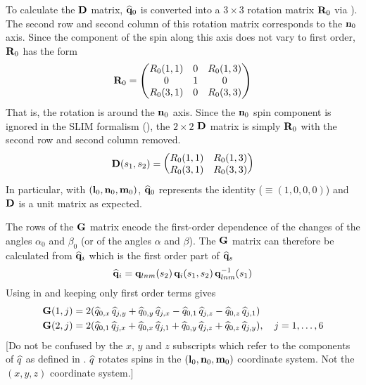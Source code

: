 {To calculate the ${\bf D}$ matrix, $\widehat{{\bf q}}_0$ is converted into a $3 \times 3$ rotation matrix
${\bf R}_0$ via ). The second row and second column of this rotation matrix corresponds to the
${\bf n}_0$ axis. Since the component of the spin along this axis does not vary to first order,
${\bf R}_0$ has the form
\begin{equation}
  {\bf R}_0 = \begin{pmatrix}
      R_0(1,1) & 0 & R_0(1,3) \\
      0        & 1 & 0        \\
      R_0(3,1) & 0 & R_0(3,3)
  \end{pmatrix}
\end{equation}
That is, the rotation is around the ${\bf n}_0$ axis. Since the ${\bf n}_0$ spin component is ignored in
the SLIM formalism (), the $2 \times 2$ ${\bf D}$ matrix is simply ${\bf R}_0$ with the second
row and second column removed.
\begin{equation}
  {\bf D}(s_1, s_2) = \begin{pmatrix}
      R_0(1,1) & R_0(1,3) \\
      R_0(3,1) & R_0(3,3)
  \end{pmatrix}
\end{equation}
In particular, with $({\bf l}_0, {\bf n}_0, {\bf m}_0)$, $\widehat {{\bf q}}_0$ represents the identity ($\equiv
(1, 0, 0, 0)$) and ${\bf D}$ is a unit matrix as expected.

The rows of the ${\bf G}$ matrix encode the first-order dependence of the changes of the angles
$\alpha_0$ and $\beta_0$ (or of the angles $\alpha$ and $\beta$).  The ${\bf G}$ matrix can therefore
be calculated from $\widehat{{\bf q}}_i$ which is the first order part of $\widehat{{\bf q}}_s$
\begin{equation}
  \widehat{{\bf q}}_i = {\bf q}_{lnm}(s_2) \, {\bf q}_i(s_1, s_2) \, {\bf q}_{lnm}^{-1}(s_1)
\end{equation}
Using  in  and keeping only first order terms gives
\begin{align}
  {\bf G}(1,j) &= 2 (\widehat q_{0,x} \, \widehat q_{j,y} + \widehat q_{0,y} \, \widehat q_{j,x} - 
                  \widehat q_{0,1} \, \widehat q_{j,z} - \widehat q_{0,z} \, \widehat q_{j,1}) \\
  {\bf G}(2,j) &= 2 (\widehat q_{0,1} \, \widehat q_{j,x} + \widehat q_{0,x} \, \widehat q_{j,1} + 
                  \widehat q_{0,y} \, \widehat q_{j,z} + \widehat q_{0,z} \, \widehat q_{j,y}),
  \quad j = 1, \ldots, 6
  \nonumber
\end{align}
[Do not be confused by the $x$, $y$ and $z$ subscripts which refer to the components of $\widehat q$
as defined in . $\widehat q$ rotates spins in the $({\bf l}_0, {\bf n}_0, {\bf m}_0)$ coordinate system.
Not the $(x, y, z)$ coordinate system.]

}

